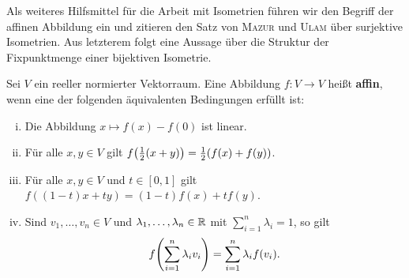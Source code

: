 Als weiteres Hilfsmittel für die Arbeit mit Isometrien führen wir den Begriff der affinen Abbildung ein und zitieren den Satz von \textsc{Mazur} und \textsc{Ulam} über surjektive Isometrien. Aus letzterem folgt eine Aussage über die Struktur der Fixpunktmenge einer bijektiven Isometrie.

\begin{definition}
\label{def_affine_abb}
	Sei $V$ ein reeller normierter Vektorraum. Eine Abbildung $f\colon V \rightarrow V$ heißt \textbf{affin}, wenn eine der folgenden äquivalenten Bedingungen erfüllt ist:
	\begin{enumerate}[(i)]
		\item Die Abbildung $x \mapsto f(x) - f(0)$ ist linear.
		\item Für alle $x,y \in V$ gilt $f\enbrace*{\frac{1}{2}(x+y)} = \frac{1}{2}(f(x)+f(y))$.
		\item Für alle $x,y \in V$ und $t \in [0,1]$ gilt $f((1-t)x + ty) = (1-t)f(x) + tf(y)$.
		\item Sind $v_1,\dots,v_n \in V$ und $\lambda_1,\dots,\lambda_n \in \mathbb{R}$ mit $\sum_{i=1}^{n} \lambda_i = 1$, so gilt
		\[
			f\enbrace*{\sum\limits_{i=1}^{n} \lambda_i v_i} = \sum\limits_{i=1}^{n} \lambda_i f(v_i).
		\]
	\end{enumerate}
\end{definition}

